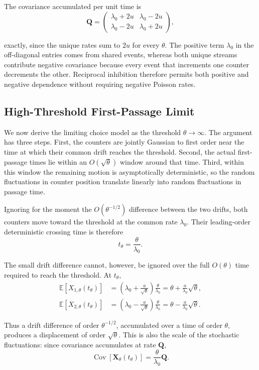 \documentclass[
  man,
  floatsintext,
  longtable,
  a4paper,
  nolmodern,
  notxfonts,
  notimes,
  colorlinks=true,linkcolor=blue,citecolor=blue,urlcolor=blue]{apa7}
\begin{document}
The covariance accumulated per unit time is \[
\mathbf Q
=
\begin{pmatrix}
\lambda_0+2u & \lambda_0-2u\\
\lambda_0-2u & \lambda_0+2u
\end{pmatrix},
\]

exactly, since the unique rates sum to \(2u\) for every \(\theta\). The
positive term \(\lambda_0\) in the off-diagonal entries comes from
shared events, whereas both unique streams contribute negative
covariance because every event that increments one counter decrements
the other. Reciprocal inhibition therefore permits both positive and
negative dependence without requiring negative Poisson rates.

\subsection{High-Threshold First-Passage
Limit}\label{high-threshold-first-passage-limit}

We now derive the limiting choice model as the threshold
\(\theta\to\infty\). The argument has three steps. First, the counters
are jointly Gaussian to first order near the time at which their common
drift reaches the threshold. Second, the actual first-passage times lie
within an \(O(\sqrt{\theta})\) window around that time. Third, within
this window the remaining motion is asymptotically deterministic, so the
random fluctuations in counter position translate linearly into random
fluctuations in passage time.

Ignoring for the moment the \(O(\theta^{-1/2})\) difference between the
two drifts, both counters move toward the threshold at the common rate
\(\lambda_0\). Their leading-order deterministic crossing time is
therefore \[
t_\theta=\frac{\theta}{\lambda_0}.
\]

The small drift difference cannot, however, be ignored over the full
\(O(\theta)\) time required to reach the threshold. At \(t_\theta\), \[
\begin{aligned}
\mathbb{E}[X_{1,\theta}(t_\theta)]
&=
\left(
\lambda_0+\frac{a}{\sqrt{\theta}}
\right)
\frac{\theta}{\lambda_0}
=
\theta+\frac{a}{\lambda_0}\sqrt{\theta},\\
\mathbb{E}[X_{2,\theta}(t_\theta)]
&=
\left(
\lambda_0-\frac{a}{\sqrt{\theta}}
\right)
\frac{\theta}{\lambda_0}
=
\theta-\frac{a}{\lambda_0}\sqrt{\theta}.
\end{aligned}
\]

Thus a drift difference of order \(\theta^{-1/2}\), accumulated over a
time of order \(\theta\), produces a displacement of order
\(\sqrt{\theta}\). This is also the scale of the stochastic
fluctuations: since covariance accumulates at rate \(\mathbf Q\), \[
\operatorname{Cov}\!\left[\mathbf X_\theta(t_\theta)\right]
=
\frac{\theta}{\lambda_0}\mathbf Q.
\]
\end{document}
